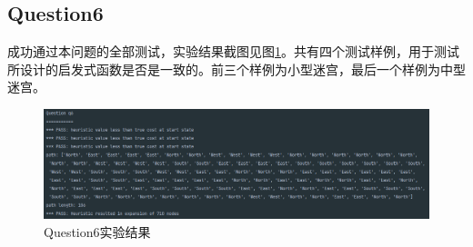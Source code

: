 \subsection{Question6}
成功通过本问题的全部测试，实验结果截图见图\ref{q6}。共有四个测试样例，用于测试所设计的启发式函数是否是一致的。前三个样例为小型迷宫，最后一个样例为中型迷宫。
\begin{figure}[htbp]
    \centering
    \includegraphics[width = \textwidth]{pic/q6.png}
    \caption{Question6实验结果}\label{q6}
\end{figure}
%
%
%
